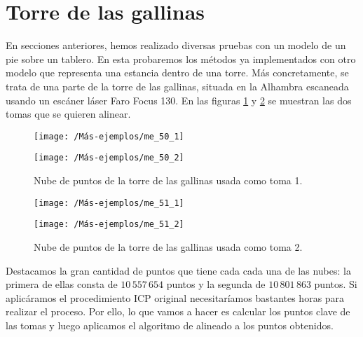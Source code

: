 \section{Torre de las gallinas}
En secciones anteriores, hemos realizado diversas pruebas con un modelo de un pie sobre un tablero. En esta probaremos los métodos ya implementados con otro modelo que representa una estancia dentro de una torre. Más concretamente, se trata de una parte de la torre de las gallinas, situada en la Alhambra escaneada usando un escáner láser Faro Focus 130. En las figuras \ref{toma1} y \ref{toma2} se muestran las dos tomas que se quieren alinear. 

\begin{figure}[h!]
	\begin{minipage}[b]{0.5\textwidth}
		\centering		
		\texttt{[image: /Más-ejemplos/me\_50\_1]} 
	\end{minipage}
	\begin{minipage}[b]{0.5\textwidth}
		\centering
		\texttt{[image: /Más-ejemplos/me\_50\_2]}
	\end{minipage}
	\caption{Nube de puntos de la torre de las gallinas usada como toma 1.}
	\label{toma1}
\end{figure}

\begin{figure}[h!]
	
	\begin{minipage}[b]{0.5\textwidth}
		\centering		
		\texttt{[image: /Más-ejemplos/me\_51\_1]} 
	\end{minipage}
	\begin{minipage}[b]{0.5\textwidth}
		\centering
		\texttt{[image: /Más-ejemplos/me\_51\_2]}
	\end{minipage}
	\caption{Nube de puntos de la torre de las gallinas usada como toma 2.}
	\label{toma2}
\end{figure}

Destacamos la gran cantidad de puntos que tiene cada cada una de las nubes: la primera de ellas consta de $ 10\,557\,654 $ puntos y la segunda de $ 10\,801\,863 $ puntos. Si aplicáramos el procedimiento ICP original necesitaríamos bastantes horas para realizar el proceso. Por ello, lo que vamos a hacer es calcular los puntos clave de las tomas y luego aplicamos el algoritmo de alineado a los puntos obtenidos.\\

